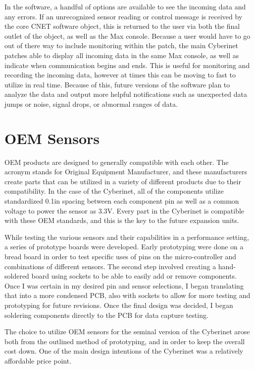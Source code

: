In the software, a handful of options are available to see the incoming data and any errors. If an unrecognized sensor reading or control message is received by the core CNET software object, this is returned to the user via both the final outlet of the object, as well as the Max console. Because a user would have to go out of there way to include monitoring within the patch, the main Cyberinet patches able to display all incoming data in the same Max console, as well as indicate when communication begins and ends. This is useful for monitoring and recording the incoming data, however at times this can be moving to fast to utilize in real time. Because of this, future versions of the software plan to analyze the data and output more helpful notifications such as unexpected data jumps or noise, signal drops, or abnormal ranges of data.

\section{OEM Sensors}

OEM products are designed to generally compatible with each other. The acronym stands for Original Equipment Manufacturer, and these manufacturers create parts that can be utilized in a variety of different products due to their compatibility. In the case of the Cyberinet, all of the components utilize standardized 0.1in spacing between each component pin as well as a common voltage to power the sensor as 3.3V. Every part in the Cyberinet is compatible with these OEM standards, and this is the key to the future expansion units.

While testing the various sensors and their capabilities in a performance setting, a series of prototype boards were developed. Early prototyping were done on a bread board in order to test specific uses of pins on the micro-controller and combinations of different sensors. The second step involved creating a hand-soldered board using sockets to be able to easily add or remove components. Once I was certain in my desired pin and sensor selections, I began translating that into a more condensed PCB, also with sockets to allow for more testing and prototyping for future revisions. Once the final design was decided, I began soldering components directly to the PCB for data capture testing.

The choice to utilize OEM sensors for the seminal version of the Cyberinet arose both from the outlined method of prototyping, and in order to keep the overall cost down. One of the main design intentions of the Cyberinet was a relatively affordable price point. 

